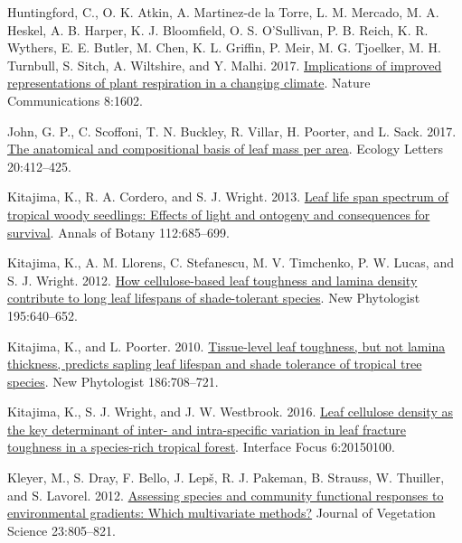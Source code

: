 \documentclass[
  12pt,
]{article}
\begin{document}
\begin{CSLReferences}{1}{0}
\leavevmode{}%
Huntingford, C., O. K. Atkin, A. Martinez-de la Torre, L. M. Mercado, M. A. Heskel, A. B. Harper, K. J. Bloomfield, O. S. O'Sullivan, P. B. Reich, K. R. Wythers, E. E. Butler, M. Chen, K. L. Griffin, P. Meir, M. G. Tjoelker, M. H. Turnbull, S. Sitch, A. Wiltshire, and Y. Malhi. 2017. \href{https://doi.org/10.1038/s41467-017-01774-z}{Implications of improved representations of plant respiration in a changing climate}. Nature Communications 8:1602.

\leavevmode{}%
John, G. P., C. Scoffoni, T. N. Buckley, R. Villar, H. Poorter, and L. Sack. 2017. \href{https://doi.org/10.1111/ele.12739}{The anatomical and compositional basis of leaf mass per area}. Ecology Letters 20:412--425.

\leavevmode{}%
Kitajima, K., R. A. Cordero, and S. J. Wright. 2013. \href{https://doi.org/10.1093/aob/mct036}{Leaf life span spectrum of tropical woody seedlings: {Effects} of light and ontogeny and consequences for survival}. Annals of Botany 112:685--699.

\leavevmode{}%
Kitajima, K., A. M. Llorens, C. Stefanescu, M. V. Timchenko, P. W. Lucas, and S. J. Wright. 2012. \href{https://doi.org/10.1111/j.1469-8137.2012.04203.x}{How cellulose-based leaf toughness and lamina density contribute to long leaf lifespans of shade-tolerant species}. New Phytologist 195:640--652.

\leavevmode{}%
Kitajima, K., and L. Poorter. 2010. \href{https://doi.org/10.1111/j.1469-8137.2010.03212.x}{Tissue-level leaf toughness, but not lamina thickness, predicts sapling leaf lifespan and shade tolerance of tropical tree species}. New Phytologist 186:708--721.

\leavevmode{}%
Kitajima, K., S. J. Wright, and J. W. Westbrook. 2016. \href{https://doi.org/10.1098/rsfs.2015.0100}{Leaf cellulose density as the key determinant of inter- and intra-specific variation in leaf fracture toughness in a species-rich tropical forest}. Interface Focus 6:20150100.

\leavevmode{}%
Kleyer, M., S. Dray, F. Bello, J. Lepš, R. J. Pakeman, B. Strauss, W. Thuiller, and S. Lavorel. 2012. \href{https://doi.org/10.1111/j.1654-1103.2012.01402.x}{Assessing species and community functional responses to environmental gradients: {Which} multivariate methods?} Journal of Vegetation Science 23:805--821.


\end{CSLReferences}
\end{document}
